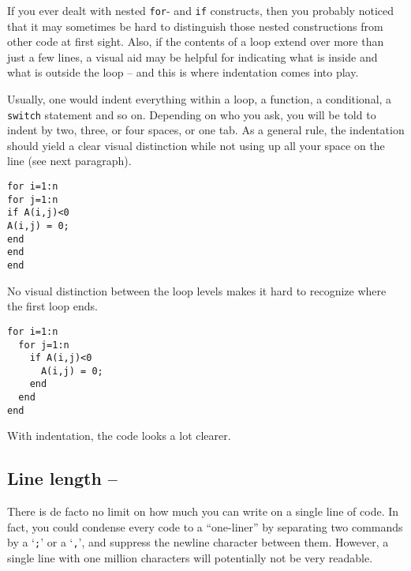 If you ever dealt with nested \lstinline!for!- and \lstinline!if! constructs,
then you probably noticed that it may sometimes be hard to distinguish those
nested constructions from other code at first sight. Also, if the contents of
a loop extend over more than just a few lines, a visual aid may be helpful for
indicating what is inside and what is outside the loop -- and this is where
indentation comes into play.

Usually, one would indent everything within a loop, a function, a conditional,
a \lstinline!switch! statement and so on. Depending on who you ask, you will be
told to indent by two, three, or four spaces, or one tab. As a general rule,
the indentation should yield a clear visual distinction while not using up all
your space on the line (see next paragraph).

\hfill
\begin{minipage}[t]{.45\textwidth}
\begin{lstlisting}[framerule=2pt,rulecolor=\color{badred}]
for i=1:n
for j=1:n
if A(i,j)<0
A(i,j) = 0;
end
end
end
\end{lstlisting}
No visual distinction between the loop levels makes it hard to recognize where the first loop ends.\footnotemark
\end{minipage}
\hfill
\begin{minipage}[t]{.45\textwidth}
\begin{lstlisting}[framerule=2pt,rulecolor=\color{goodgreen}]
for i=1:n
  for j=1:n
    if A(i,j)<0
      A(i,j) = 0;
    end
  end
end
\end{lstlisting}
With indentation, the code looks a lot clearer.\footnotemark[\value{footnote}]
\end{minipage}
\hfill






\subsection{Line length -- \cleansymbol}
There is de facto no limit on how much you can write on a single line of
\matlab{} code. In fact, you could condense every \matlab{} code to a
``one-liner'' by separating two commands by a `\lstinline!;!' or a
`\lstinline!,!', and suppress the newline character between them. However, a
single line with one million characters will potentially not be very readable.

